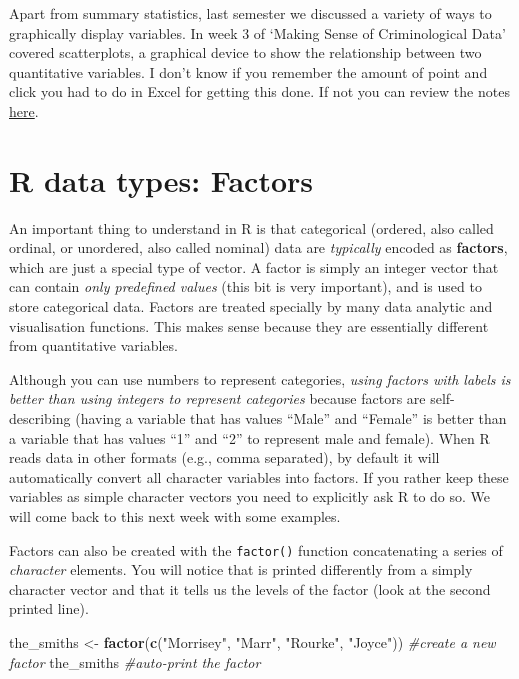 \documentclass[
]{book}
\newenvironment{Shaded}{\begin{snugshade}}{\end{snugshade}}
\newcommand{\CommentTok}[1]{\textcolor[rgb]{0.56,0.35,0.01}{\textit{#1}}}
\newcommand{\FunctionTok}[1]{\textcolor[rgb]{0.13,0.29,0.53}{\textbf{#1}}}
\newcommand{\NormalTok}[1]{#1}
\newcommand{\OtherTok}[1]{\textcolor[rgb]{0.56,0.35,0.01}{#1}}
\newcommand{\StringTok}[1]{\textcolor[rgb]{0.31,0.60,0.02}{#1}}
\begin{document}
Apart from summary statistics, last semester we discussed a variety of ways to graphically display variables. In week 3 of `Making Sense of Criminological Data' covered scatterplots, a graphical device to show the relationship between two quantitative variables. I don't know if you remember the amount of point and click you had to do in Excel for getting this done. If not you can review the notes \href{https://maczokni.github.io/MSCD_labs/week3.html}{here}.

\section{R data types: Factors}\label{r-data-types-factors}

An important thing to understand in R is that categorical (ordered, also called ordinal, or unordered, also called nominal) data are \emph{typically} encoded as \textbf{factors}, which are just a special type of vector. A factor is simply an integer vector that can contain \emph{only predefined values} (this bit is very important), and is used to store categorical data. Factors are treated specially by many data analytic and visualisation functions. This makes sense because they are essentially different from quantitative variables.

Although you can use numbers to represent categories, \emph{using factors with labels is better than using integers to represent categories} because factors are self-describing (having a variable that has values ``Male'' and ``Female'' is better than a variable that has values ``1'' and ``2'' to represent male and female). When R reads data in other formats (e.g., comma separated), by default it will automatically convert all character variables into factors. If you rather keep these variables as simple character vectors you need to explicitly ask R to do so. We will come back to this next week with some examples.

Factors can also be created with the \texttt{factor()} function concatenating a series of \emph{character} elements. You will notice that is printed differently from a simply character vector and that it tells us the levels of the factor (look at the second printed line).

\begin{Shaded}
\begin{Highlighting}[]
\NormalTok{the\_smiths }\OtherTok{\textless{}{-}} \FunctionTok{factor}\NormalTok{(}\FunctionTok{c}\NormalTok{(}\StringTok{"Morrisey"}\NormalTok{, }\StringTok{"Marr"}\NormalTok{, }\StringTok{"Rourke"}\NormalTok{, }\StringTok{"Joyce"}\NormalTok{)) }\CommentTok{\#create a new factor}
\NormalTok{the\_smiths }\CommentTok{\#auto{-}print the factor}
\end{Highlighting}
\end{Shaded}
\end{document}
